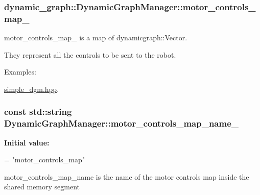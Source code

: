 \subsubsection[{\texorpdfstring{motor\+\_\+controls\+\_\+map\+\_\+}{motor_controls_map_}}]{ dynamic\+\_\+graph\+::\+Dynamic\+Graph\+Manager\+::motor\+\_\+controls\+\_\+map\+\_\+\hspace{0.3cm}{\ttfamily [protected]}}\hypertarget{classdynamic__graph_1_1DynamicGraphManager_a03eabd2f08990a1dcc1caa652b701020}{}\label{classdynamic__graph_1_1DynamicGraphManager_a03eabd2f08990a1dcc1caa652b701020}


motor\+\_\+controls\+\_\+map\+\_\+ is a map of dynamicgraph\+::\+Vector. 

They represent all the controls to be sent to the robot. \begin{Desc}
\item[Examples\+: ]\par
\hyperlink{simple_dgm_8hpp-example}{simple\+\_\+dgm.\+hpp}.\end{Desc}
\subsubsection[{\texorpdfstring{motor\+\_\+controls\+\_\+map\+\_\+name\+\_\+}{motor_controls_map_name_}}]{\setlength{\rightskip}{0pt plus 5cm}const std\+::string Dynamic\+Graph\+Manager\+::motor\+\_\+controls\+\_\+map\+\_\+name\+\_\+\hspace{0.3cm}{\ttfamily [static]}}\hypertarget{classdynamic__graph_1_1DynamicGraphManager_a056de4d7a49496b2b0812d96d93370d9}{}\label{classdynamic__graph_1_1DynamicGraphManager_a056de4d7a49496b2b0812d96d93370d9}
{\bfseries Initial value\+:}
\begin{DoxyCode}
=
    \textcolor{stringliteral}{"motor\_controls\_map"}
\end{DoxyCode}


motor\+\_\+controls\+\_\+map\+\_\+name is the name of the motor controls map inside the shared memory segment 

